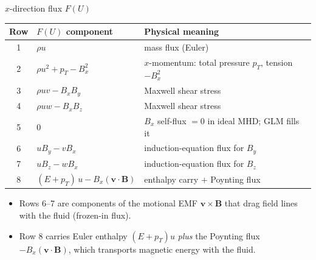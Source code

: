 \documentclass[aspectratio=43]{beamer}
\begin{document}
\begin{frame}{$x$-direction flux $F(U)$}
  \centering
  \footnotesize
  \begin{tabular}{c@{\quad}l@{\qquad}l}
  \toprule
  Row & $F(U)$ component & Physical meaning \\
  \midrule
  1 & $\rho u$                                       & mass flux (Euler) \\
  2 & $\rho u^{2} + p_T - B_x^{2}$                   & $x$-momentum: total pressure $p_T$, tension $-B_x^{2}$ \\
  3 & $\rho u v - B_x B_y$                           & Maxwell shear stress \\
  4 & $\rho u w - B_x B_z$                           & Maxwell shear stress \\
  5 & $0$                                            & $B_x$ self-flux $= 0$ in ideal MHD; GLM fills it \\
  6 & $u B_y - v B_x$                                & induction-equation flux for $B_y$ \\
  7 & $u B_z - w B_x$                                & induction-equation flux for $B_z$ \\
  8 & $(E + p_T)\,u - B_x(\mathbf{v}\!\cdot\!\mathbf{B})$ & enthalpy carry $+$ Poynting flux \\
  \bottomrule
  \end{tabular}
  \vspace{0.6em}
  \begin{itemize}\scriptsize
    \item Rows 6--7 are components of the motional EMF $\mathbf{v}\!\times\!\mathbf{B}$ that drag field lines with the fluid (frozen-in flux).
    \item Row 8 carries Euler enthalpy $(E + p_T)u$ \emph{plus} the Poynting flux $-B_x(\mathbf{v}\!\cdot\!\mathbf{B})$, which transports magnetic energy with the fluid.
  \end{itemize}
\end{frame}
\end{document}
